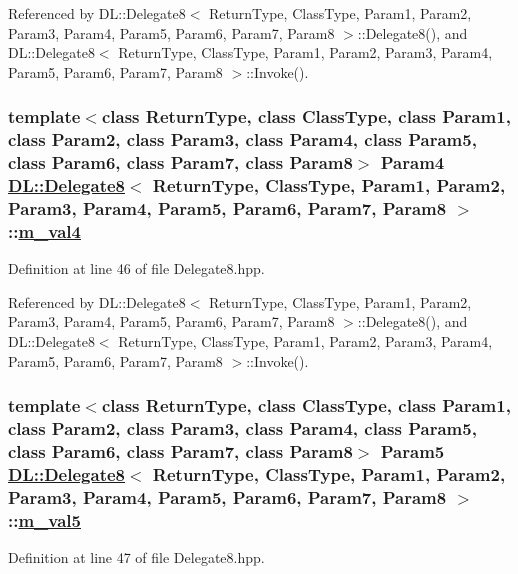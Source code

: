 Referenced by DL::Delegate8$<$ Return\-Type, Class\-Type, Param1, Param2, Param3, Param4, Param5, Param6, Param7, Param8 $>$::Delegate8(), and DL::Delegate8$<$ Return\-Type, Class\-Type, Param1, Param2, Param3, Param4, Param5, Param6, Param7, Param8 $>$::Invoke().\hypertarget{classDL_1_1Delegate8_r5}{
\subsubsection[m\_\-val4]{\setlength{\rightskip}{0pt plus 5cm}template$<$class Return\-Type, class Class\-Type, class Param1, class Param2, class Param3, class Param4, class Param5, class Param6, class Param7, class Param8$>$ Param4 \hyperlink{classDL_1_1Delegate8}{DL::Delegate8}$<$ Return\-Type, Class\-Type, Param1, Param2, Param3, Param4, Param5, Param6, Param7, Param8 $>$::\hyperlink{classDL_1_1Delegate8_r5}{m\_\-val4}}}
\label{classDL_1_1Delegate8_r5}




Definition at line 46 of file Delegate8.hpp.

Referenced by DL::Delegate8$<$ Return\-Type, Class\-Type, Param1, Param2, Param3, Param4, Param5, Param6, Param7, Param8 $>$::Delegate8(), and DL::Delegate8$<$ Return\-Type, Class\-Type, Param1, Param2, Param3, Param4, Param5, Param6, Param7, Param8 $>$::Invoke().\hypertarget{classDL_1_1Delegate8_r6}{
\subsubsection[m\_\-val5]{\setlength{\rightskip}{0pt plus 5cm}template$<$class Return\-Type, class Class\-Type, class Param1, class Param2, class Param3, class Param4, class Param5, class Param6, class Param7, class Param8$>$ Param5 \hyperlink{classDL_1_1Delegate8}{DL::Delegate8}$<$ Return\-Type, Class\-Type, Param1, Param2, Param3, Param4, Param5, Param6, Param7, Param8 $>$::\hyperlink{classDL_1_1Delegate8_r6}{m\_\-val5}}}
\label{classDL_1_1Delegate8_r6}




Definition at line 47 of file Delegate8.hpp.

